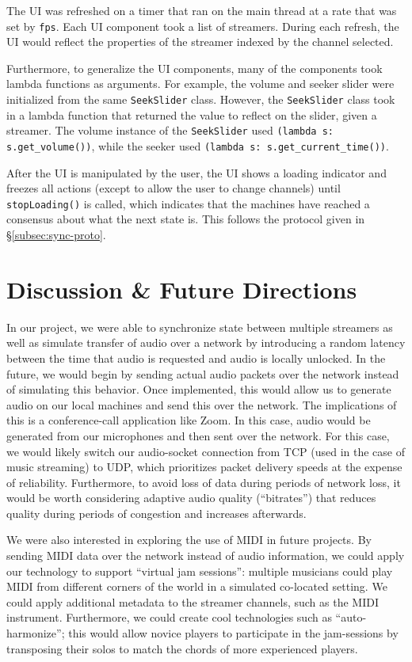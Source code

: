 \documentclass[%
               nonacm,sigconf,10pt]{acmart}
\newcommand{\py}[1]{\texttt{#1}}
\begin{document}
The UI was refreshed on a timer that ran on the main thread at a rate that was set by \py{fps}. Each UI component took a list of streamers. During each refresh, the UI would reflect the properties of the streamer indexed by the channel selected. 

Furthermore, to generalize the UI components, many of the components took lambda functions as arguments. For example, the volume and seeker slider were initialized from the same \py{SeekSlider} class. However, the \py{SeekSlider} class took in a lambda function that returned the value to reflect on the slider, given a streamer. The volume instance of the \py{SeekSlider} used \py{(lambda s: s.get_volume())}, while the seeker used \py{(lambda s: s.get_current_time())}.

After the UI is manipulated by the user, the UI shows a loading indicator and freezes all actions (except to allow the user to change channels) until \py{stopLoading()} is called, which indicates that the machines have reached a consensus about what the next state is. This follows the protocol given in \S \ref{subsec:sync-proto}.

\section{Discussion \& Future Directions}\label{sec:disc}

In our project, we were able to synchronize state between multiple streamers as well as simulate transfer of audio over a network by introducing a random latency between the time that audio is requested and audio is locally unlocked. In the future, we would begin by sending actual audio packets over the network instead of simulating this behavior. Once implemented, this would allow us to generate audio on our local machines and send this over the network. The implications of this is a conference-call application like Zoom. In this case, audio would be generated from our microphones and then sent over the network. For this case, we would likely switch our audio-socket connection from TCP (used in the case of music streaming) to UDP, which prioritizes packet delivery speeds at the expense of reliability. Furthermore, to avoid loss of data during periods of network loss, it would be worth considering adaptive audio quality (``bitrates'') that reduces quality during periods of congestion and increases afterwards.

We were also interested in exploring the use of MIDI in future projects. By sending MIDI data over the network instead of audio information, we could apply our technology to support ``virtual jam sessions'': multiple musicians could play MIDI from different corners of the world in a simulated co-located setting. We could apply additional metadata to the streamer channels, such as the MIDI instrument. Furthermore, we could create cool technologies such as ``auto-harmonize''; this would allow novice players to participate in the jam-sessions by transposing their solos to match the chords of more experienced players.
\end{document}
